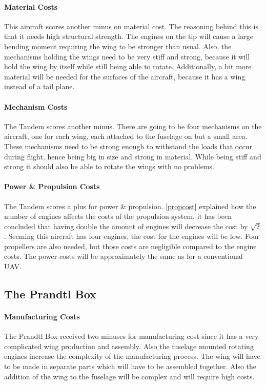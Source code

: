\paragraph{Material Costs} This aircraft scores another minus on material cost. The reasoning behind this is that it needs high structural strength. The engines on the tip will cause a large bending moment requiring the wing to be stronger than usual. Also, the mechanisms holding the wings need to be very stiff and strong, because it will hold the wing by itself while still being able to rotate. Additionally, a bit more material will be needed for the surfaces of the aircraft, because it has a wing instead of a tail plane.

\paragraph{Mechanism Costs} The Tandem scores another minus. There are going to be four mechanisms on the aircraft, one for each wing, each attached to the fuselage on but a small area. These mechanisms need to be strong enough to withstand the loads that occur during flight, hence being big in size and strong in material. While being stiff and strong it should also be able to rotate the wings with no problems.

\paragraph{Power \& Propulsion Costs} The Tandem scores a plus for power \& propulsion. \autoref{propcost} explained how the number of engines affects the costs of the propulsion system, it has been concluded that having double the amount of engines will decrease the cost by $\sqrt{2}$. Seeming this aircraft has four engines, the cost for the engines will be low. Four propellers are also needed, but those costs are negligible compared to the engine costs. The power costs will be approximately the same as for a conventional UAV.



\subsection{The Prandtl Box}

\paragraph{Manufacturing Costs} The Prandtl Box received two minuses for manufacturing cost since it has a very complicated wing production and assembly. Also the fuselage mounted rotating engines increase the complexity of the manufacturing process. The wing will have to be made in separate parts which will have to be assembled together. Also the addition of the wing to the fuselage will be complex and will require high costs. 

